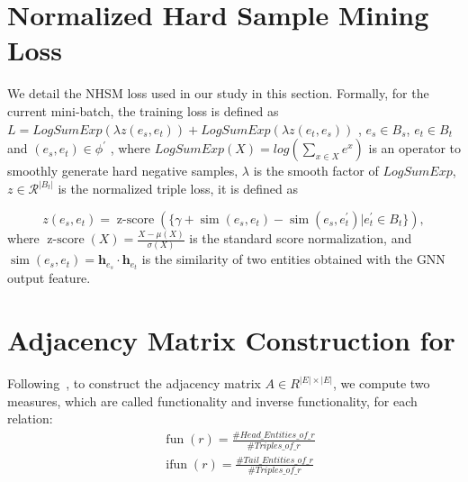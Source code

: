 
\section{Normalized Hard Sample Mining Loss}
\label{app:nhsm}
We detail the NHSM loss used in our study in this section.
 Formally, for the current mini-batch, the training loss is defined as 
$L = LogSumExp(\lambda z(e_s, e_t)) + LogSumExp(\lambda z(e_t, e_s))$
, $e_s \in B_s$, $e_t \in B_t$ and $(e_s, e_t) \in \phi^{\prime}$
, where
$LogSumExp(X) = log(\sum_{x \in X}e^x)$
is an operator to smoothly generate hard negative samples, 
$\lambda$ is the smooth factor of $LogSumExp$, 
$z \in\mathcal{R}^{|B_t|}$ is the normalized triple loss, it is defined as 

\vspace{-5mm}
\begin{equation}
z(e_{s}, e_{t}) =\operatorname{z-score}(\{\gamma+\operatorname{sim}(e_{s}, e_{t})-\operatorname{sim}(e_{s}, e_{t}^{\prime}) | e^{\prime}_t \in B_t\}),
\end{equation}
where  $\operatorname{z-score}(X)=  \frac{X - \mu(X)}{\sigma(X)}$ is the standard score normalization, 
and $\operatorname{sim}(e_{s}, e_{t})= \mathbf{h}_{e_s} \cdot \mathbf{h}_{e_t}$ is the similarity of two entities obtained with the GNN output feature.



\section{Adjacency Matrix Construction for \MetisGCN{}}
\label{app:adj-matrix}
Following~\cite{GCN-Align18}, to construct the adjacency matrix $A \in R^{|E|\times|E|}$, we compute two measures, which are called functionality and inverse functionality, for each relation:
\begin{equation}
\begin{aligned}
&\operatorname{fun}(r)=\frac{\#  Head\_Entities\_of\_r }{\# Triples\_of\_r } \\
&\operatorname{ ifun }(r)=\frac{\# Tail\_Entities\_of\_r }{\#  Triples\_of\_r }
\end{aligned}
\end{equation}

